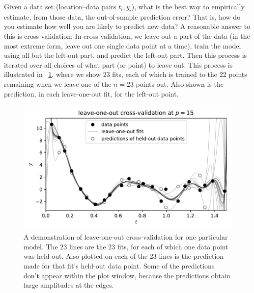 \documentclass[12pt,letterpaper]{article}
\newlength{\figurewidth}
\begin{document}
Given a data set (location--data pairs $t_i, y_i$), what is the best way to empirically estimate, from those data, the out-of-sample prediction error?
That is, how do you estimate how well you are likely to predict new data?
A reasonable answer to this is cross-validation:
In cross-validation, we leave out a part of the data (in the most extreme form, leave out one single data point at a time), train the model using all but the left-out part, and predict the left-out part. Then this process is iterated over all choices of what part (or point) to leave out.
This process is illustrated in \figurename~\ref{fig:loo}, where we show $23$ fits, each of which is trained to the 22 points remaining when we leave one of the $n=23$ points out.
Also shown is the prediction, in each leave-one-out fit, for the left-out point.
\begin{figure}[t]
    \begin{mdframed}
    \includegraphics[width=\figurewidth]{paper/LOO.pdf}
    \caption{A demonstration of leave-one-out cross-validation for one particular model. The 23 lines are the 23 fits, for each of which one data point was held out. Also plotted on each of the 23 lines is the prediction made for that fit's held-out data point. Some of the predictions don't appear within the plot window, because the predictions obtain large amplitudes at the edges.}
    \label{fig:loo}
    \end{mdframed}
\end{figure}
\end{document}
